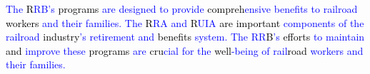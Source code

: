\begin{tcolorbox}
    \textcolor{blue}{The} \textcolor{black}{R}\textcolor{blue}{R}\textcolor{blue}{B}\textcolor{blue}{'}\textcolor{blue}{s} \textcolor{black}{programs} \textcolor{blue}{are} \textcolor{blue}{designed} \textcolor{blue}{to} \textcolor{blue}{provide} \textcolor{black}{compreh}\textcolor{blue}{ensive} \textcolor{blue}{benefits} \textcolor{blue}{to} \textcolor{blue}{rail}\textcolor{blue}{road} \textcolor{black}{workers} \textcolor{blue}{and} \textcolor{blue}{their} \textcolor{blue}{families}\textcolor{blue}{.} \textcolor{blue}{The} \textcolor{black}{R}\textcolor{blue}{RA} \textcolor{blue}{and} \textcolor{black}{R}\textcolor{blue}{UI}\textcolor{blue}{A} \textcolor{black}{are} \textcolor{black}{important} \textcolor{blue}{components} \textcolor{blue}{of} \textcolor{blue}{the} \textcolor{blue}{rail}\textcolor{blue}{road} \textcolor{black}{industry}\textcolor{blue}{'}\textcolor{blue}{s} \textcolor{blue}{ret}\textcolor{blue}{irement} \textcolor{blue}{and} \textcolor{black}{benefits} \textcolor{blue}{system}\textcolor{blue}{.} \textcolor{blue}{The} \textcolor{blue}{R}\textcolor{blue}{R}\textcolor{black}{B}\textcolor{blue}{'}\textcolor{blue}{s} \textcolor{black}{efforts} \textcolor{blue}{to} \textcolor{blue}{maintain} \textcolor{black}{and} \textcolor{blue}{improve} \textcolor{blue}{these} \textcolor{black}{programs} \textcolor{blue}{are} \textcolor{black}{cru}\textcolor{blue}{cial} \textcolor{blue}{for} \textcolor{blue}{the} \textcolor{black}{well}\textcolor{blue}{-}\textcolor{blue}{be}\textcolor{blue}{ing} \textcolor{blue}{of} \textcolor{blue}{rail}\textcolor{black}{road} \textcolor{blue}{workers} \textcolor{blue}{and} \textcolor{blue}{their} \textcolor{blue}{families}\textcolor{blue}{.}
\end{tcolorbox}

